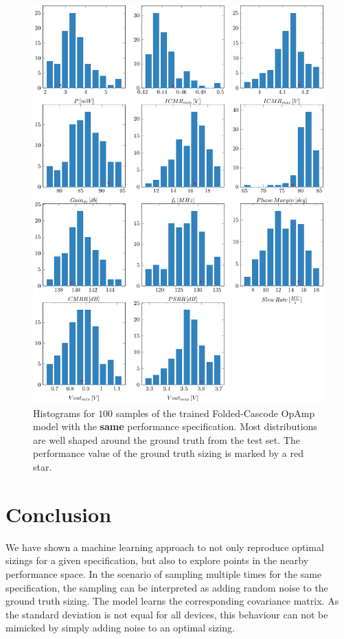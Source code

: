 \documentclass[conference]{IEEEtran}
\begin{document}
		
	\begin{figure}[]
		\centering
		\includegraphics[width=\linewidth]{figures/histograms_simple53_100samples}
		\caption{Histograms for $100$ samples of the trained Folded-Cascode OpAmp model with the \textbf{same} performance specification. Most distributions are well shaped around the ground truth from the test set. The performance value of the ground truth sizing is marked by a red star.}
		\label{fig:histograms53}
	\end{figure}
	
	
	
	
\section{Conclusion}
	We have shown a machine learning approach to not only reproduce optimal sizings for a given specification, but also to explore points in the nearby performance space. In the scenario of sampling multiple times for the same specification, the sampling can be interpreted as adding random noise to the ground truth sizing. The model learns the corresponding covariance matrix. As the standard deviation is not equal for all devices, this behaviour can not be mimicked by simply adding noise to an optimal sizing.



\end{document}
